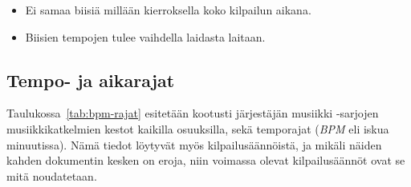\documentclass[12pt, a4paper, oneside]{article}
\begin{document}
\begin{itemize}[itemsep=-2pt]
    \item Ei samaa biisiä millään kierroksella koko kilpailun aikana.
    \item Biisien tempojen tulee vaihdella laidasta laitaan.
\end{itemize}

\subsection{Tempo- ja aikarajat} \label{subsec:rajat}

Taulukossa~\ref{tab:bpm-rajat} esitetään kootusti järjestäjän musiikki -sarjojen musiikkikatkelmien kestot kaikilla osuuksilla,
sekä temporajat (\textit{BPM} eli iskua minuutissa).
Nämä tiedot löytyvät myös kilpailusäännöistä,
ja mikäli näiden kahden dokumentin kesken on eroja,
niin voimassa olevat kilpailusäännöt ovat se mitä noudatetaan. \medskip
\end{document}
